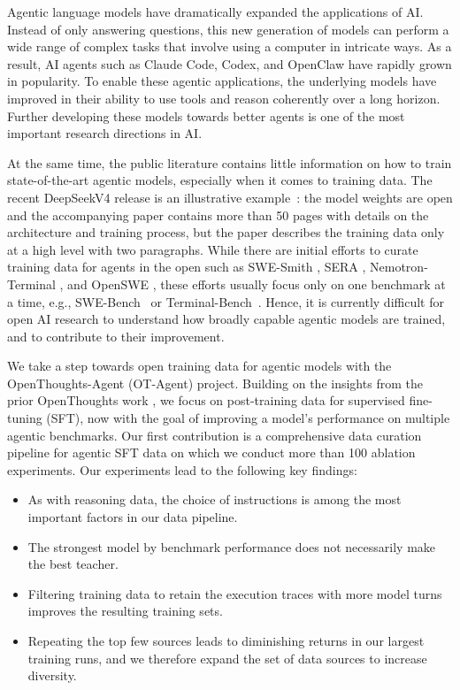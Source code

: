 \documentclass{llmxive}
\begin{document}
Agentic language models have dramatically expanded the applications of AI.
Instead of only answering questions, this new generation of models can perform a wide range of complex tasks that involve using a computer in intricate ways.
As a result, AI agents such as Claude Code, Codex, and OpenClaw have rapidly grown in popularity.
To enable these agentic applications, the underlying models have improved in their ability to use tools and reason coherently over a long horizon.
Further developing these models towards better agents is one of the most important research directions in AI.

At the same time, the public literature contains little information on how to train state-of-the-art agentic models, especially when it comes to training data.
The recent DeepSeekV4 release is an illustrative example~\citep{dsv4}: the model weights are open and the accompanying paper contains more than 50 pages with details on the architecture and training process, but the paper describes the training data only at a high level with two paragraphs.
While there are initial efforts to curate training data for agents in the open such as SWE-Smith \citep{yang2025swesmithscalingdatasoftware}, SERA \citep{shen2026serasoftverifiedefficientrepository}, Nemotron-Terminal \citep{pi2026dataengineeringscalingllm}, and OpenSWE \citep{fu2026davincienvopensweenvironment}, these efforts usually focus only on one benchmark at a time, e.g., SWE-Bench~\citep{jimenez2024swebenchlanguagemodelsresolve} or Terminal-Bench~\citep{merrill2026terminalbenchbenchmarkingagentshard}.
Hence, it is currently difficult for open AI research to understand how broadly capable agentic models are trained, and to contribute to their improvement.

We take a step towards open training data for agentic models with the OpenThoughts-Agent (OT-Agent) project.
Building on the insights from the prior OpenThoughts work \citep{guha2025openthoughtsdatarecipesreasoning}, we focus on post-training data for supervised fine-tuning (SFT), now with the goal of improving a model’s performance on multiple agentic benchmarks.
Our first contribution is a comprehensive data curation pipeline for agentic SFT data on which we conduct more than 100 ablation experiments.
Our experiments lead to the following key findings:
\begin{itemize}[topsep=0pt, itemsep=2pt, parsep=0pt, leftmargin=5.5mm]
\item As with reasoning data, the choice of instructions is among the most important factors in our data pipeline.
\item The strongest model by benchmark performance does not necessarily make the best teacher.
\item Filtering training data to retain the execution traces with more model turns improves the resulting training sets.
\item Repeating the top few sources leads to diminishing returns in our largest training runs, and we therefore expand the set of data sources to increase diversity.
\end{itemize}
\end{document}
